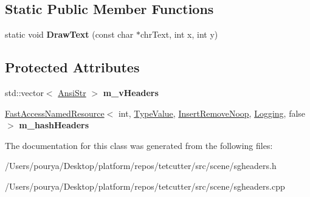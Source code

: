\subsection*{Static Public Member Functions}
\begin{DoxyCompactItemize}
\item 
\hypertarget{classps_1_1scene_1_1SGHeaders_a512b8471d188fa4e8018f166ffb989ef}{}static void {\bfseries Draw\+Text} (const char $\ast$chr\+Text, int x, int y)\label{classps_1_1scene_1_1SGHeaders_a512b8471d188fa4e8018f166ffb989ef}

\end{DoxyCompactItemize}
\subsection*{Protected Attributes}
\begin{DoxyCompactItemize}
\item 
\hypertarget{classps_1_1scene_1_1SGHeaders_afc589b819662a7fdb8ac0045c71e3d89}{}std\+::vector$<$ \hyperlink{classps_1_1base_1_1CAString}{Ansi\+Str} $>$ {\bfseries m\+\_\+v\+Headers}\label{classps_1_1scene_1_1SGHeaders_afc589b819662a7fdb8ac0045c71e3d89}

\item 
\hypertarget{classps_1_1scene_1_1SGHeaders_a496d83efe2ac71f174ab1068a88e61fe}{}\hyperlink{classps_1_1FastAccessNamedResource}{Fast\+Access\+Named\+Resource}$<$ int, \hyperlink{structps_1_1TypeValue}{Type\+Value}, \hyperlink{structps_1_1InsertRemoveNoop}{Insert\+Remove\+Noop}, \hyperlink{structps_1_1Logging}{Logging}, false $>$ {\bfseries m\+\_\+hash\+Headers}\label{classps_1_1scene_1_1SGHeaders_a496d83efe2ac71f174ab1068a88e61fe}

\end{DoxyCompactItemize}


The documentation for this class was generated from the following files\+:\begin{DoxyCompactItemize}
\item 
/\+Users/pourya/\+Desktop/platform/repos/tetcutter/src/scene/sgheaders.\+h\item 
/\+Users/pourya/\+Desktop/platform/repos/tetcutter/src/scene/sgheaders.\+cpp\end{DoxyCompactItemize}
